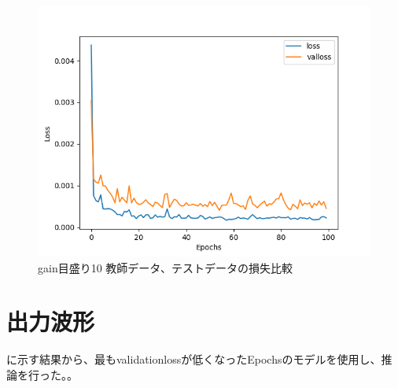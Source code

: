\documentclass{jreport}		%
\begin{document}
\begin{figure}[htbp]
 \begin{center}
  \includegraphics[width=150mm]{gain10_loss_hikaku.png}
 \end{center}
 \caption{gain目盛り10 教師データ、テストデータの損失比較}
 \label{fig:one}
\end{figure}

\newpage
\section{出力波形}
に示す結果から、最もvalidationlossが低くなったEpochsのモデルを使用し、推論を行った。。
\end{document}
